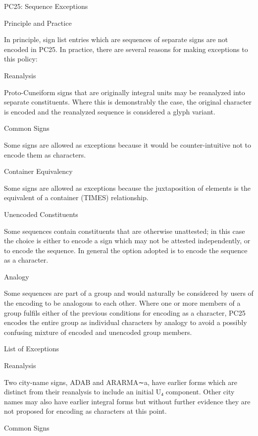 \Hh{}PC25: Sequence Exceptions

\Hhh{}Principle and Practice


\par In principle, sign list entries which are sequences of
      separate signs are not encoded in PC25. In practice, there are
      several reasons for making exceptions to this policy:

\Hdl\Hdt{}Reanalysis

{}Proto-Cuneiform signs that are originally integral units
	may be reanalyzed into separate constituents. Where this is
	demonstrably the case, the original character is encoded and
	the reanalyzed sequence is considered a glyph variant.

\Hdt{}Common Signs

{}Some signs are allowed as exceptions because it would be
	counter-intuitive not to encode them as characters.

\Hdt{}Container Equivalency

{}Some signs are allowed as exceptions because the
	juxtaposition of elements is the equivalent of a container
	(TIMES) relationship.

\Hdt{}Unencoded Constituents

{}Some sequences contain constituents that are otherwise
	unattested; in this case the choice is either to encode a sign
	which may not be attested independently, or to encode the
	sequence.  In general the option adopted is to encode the
	sequence as a character.

\Hdt{}Analogy

{}Some sequences are part of a group and would naturally be
	considered by users of the encoding to be analogous to each
	other. Where one or more members of a group fulfils either of
	the previous conditions for encoding as a character, PC25
	encodes the entire group as individual characters by analogy
	to avoid a possibly confusing mixture of encoded and unencoded
	group members.

\Henddl
\Hhh{}List of Exceptions

\Hhhh{}Reanalysis


\par Two city-name signs, ADAB and ARARMA∼a, have earlier forms
      which are distinct from their reanalysis to include an initial
      U₄ component.  Other city names may also have earlier integral
      forms but without further evidence they are not proposed for
      encoding as characters at this point.

\Hhhh{}Common Signs


